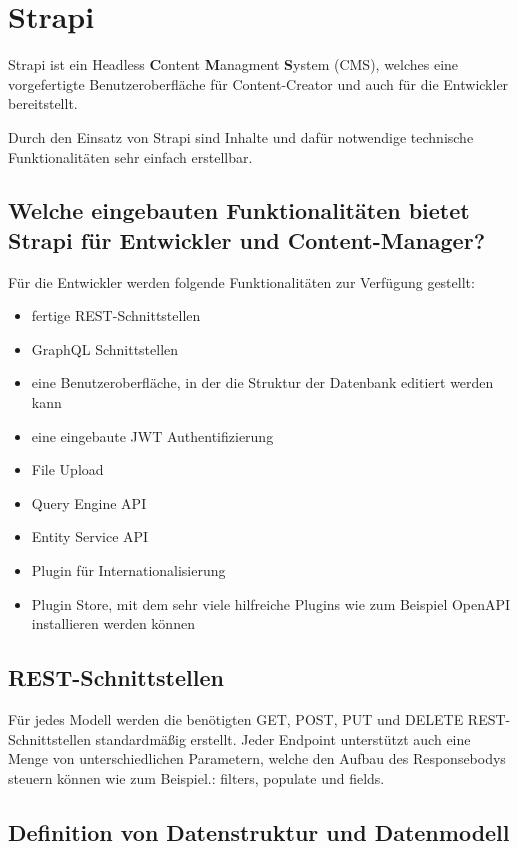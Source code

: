 \section{Strapi}
Strapi ist ein Headless \textbf{C}ontent \textbf{M}anagment \textbf{S}ystem (CMS),
welches eine vorgefertigte Benutzeroberfläche für Content-Creator
und auch für die Entwickler bereitstellt.

Durch den Einsatz von Strapi sind Inhalte und dafür notwendige technische Funktionalitäten
sehr einfach erstellbar.
\cite{strapi-vs-wordpress}


\subsection*{Welche eingebauten Funktionalitäten bietet Strapi für Entwickler und Content-Manager?}


Für die Entwickler werden folgende Funktionalitäten zur Verfügung gestellt:

\begin{itemize}
  \item fertige REST-Schnittstellen
  \item GraphQL Schnittstellen
  \item eine Benutzeroberfläche, in der die Struktur der Datenbank editiert werden kann
  \item eine eingebaute JWT Authentifizierung
  \item File Upload
  \item Query Engine API
  \item Entity Service API
  \item Plugin für Internationalisierung
  \item Plugin Store, mit dem sehr viele hilfreiche Plugins wie zum Beispiel OpenAPI installieren werden können
\end{itemize}

\subsection{REST-Schnittstellen}
\label{subsec:rest}
Für jedes Modell werden die benötigten GET, POST, PUT und DELETE REST-Schnittstellen standardmäßig erstellt.
Jeder Endpoint unterstützt auch eine Menge von unterschiedlichen Parametern, welche den Aufbau des Responsebodys steuern können wie zum Beispiel.: filters, populate  und fields.
\cite{rest-query-parameters}
\subsection{Definition von Datenstruktur und Datenmodell}

